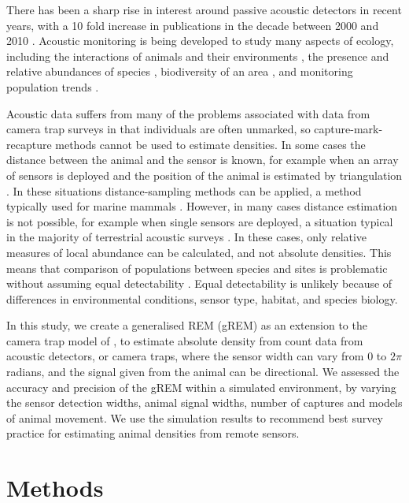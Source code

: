 \documentclass[a4paper,10pt,reqno,oneside]{amsart}
\begin{document}
There has been a sharp rise in interest around passive acoustic detectors in recent years, with a 10 fold increase in publications in the decade between 2000 and 2010 \citep{kessel2014review}. Acoustic monitoring is being developed to study many aspects of ecology, including the interactions of animals and their environments \citep{blumstein2011acoustic, rogers2013density}, the presence and relative abundances of species \citep{marcoux2011local}, biodiversity of an area \citep{depraetere2012monitoring}, and monitoring population trends \citep{walters2013challenges}. 

Acoustic data suffers from many of the problems associated with data from camera trap surveys in that individuals are often unmarked, so capture-mark-recapture methods cannot be used to estimate densities. In some cases the distance between the animal and the sensor is known, for example when an array of sensors is deployed and the position of the animal is estimated by triangulation \citep{lewis2007sperm}. In these situations distance-sampling methods can be applied, a method typically used for marine mammals \citep{rogers2013density}. However, in many cases distance estimation is not possible, for example when single sensors are deployed, a situation typical in the majority of terrestrial acoustic surveys  \citep{elphick2008you, buckland2008estimating}. In these cases, only relative measures of local abundance can be calculated, and not absolute densities. This means that comparison of populations between species and sites is problematic without assuming equal detectability \citep{hayes2000assumptions, schmidt2003count, walters2013challenges}. Equal detectability is unlikely because of differences in environmental conditions, sensor type, habitat, and species biology. 

In this study, we create a generalised REM (gREM) as an extension to the camera trap model of \citet{rowcliffe2008estimating}, to estimate absolute density from count data from acoustic detectors, or camera traps, where the sensor width can vary from 0 to $2\pi$ radians, and the signal given from the animal can be directional. We assessed the accuracy and precision of the gREM within a simulated environment, by varying the sensor detection widths, animal signal widths, number of captures and models of animal movement. We use the simulation results to recommend best survey practice for estimating animal densities from remote sensors. 

\section*{Methods}
\end{document}

